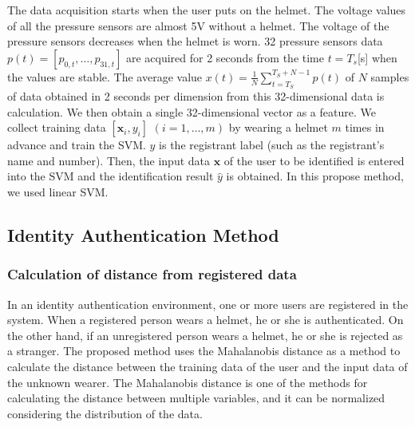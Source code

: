 \documentclass[sigchi,authordraft]{acmart}
\begin{document}

The data acquisition starts when the user puts on the helmet. The voltage values of all the pressure sensors are almost 5V without a helmet. The voltage of the pressure sensors decreases when the helmet is worn. 32 pressure sensors data $p(t)=[p_{0,t},\dots,p_{31,t}]$ are acquired for 2 seconds from the time $t=T_s$[s] when the values are stable. The average value $x(t)=\frac{1}{N}\sum_{t=T_S}^{T_S+N-1}p(t)$ of $N$ samples of data obtained in 2 seconds per dimension from this 32-dimensional data is calculation. We then obtain a single 32-dimensional vector as a feature. We collect training data $[\bm{x}_i,y_i]$ $(i=1,\dots, m)$ by wearing a helmet $m$ times in advance and train the SVM. $y$ is the registrant label (such as the registrant's name and number). Then, the input data $\bm{x}$ of the user to be identified is entered into the SVM and the identification result $\hat{y}$ is obtained. In this propose method, we used linear SVM.


\subsection{Identity Authentication Method}
\subsubsection{Calculation of distance from registered data}
In an identity authentication environment, one or more users are registered in the system. When a registered person wears a helmet, he or she is authenticated. On the other hand, if an unregistered person wears a helmet, he or she is rejected as a stranger. The proposed method uses the Mahalanobis distance as a method to calculate the distance between the training data of the user and the input data of the unknown wearer. The Mahalanobis distance is one of the methods for calculating the distance between multiple variables, and it can be normalized considering the distribution of the data.\par
\end{document}
